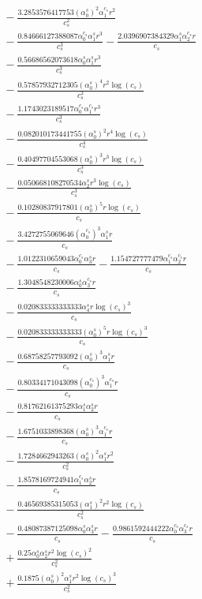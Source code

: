 \documentclass[10pt]{article}
\begin{document}
\begin{align*}
&{}  - \frac{3.2853576417753 \left(\alpha_{0}^s\right)^{2} \alpha_{1}^{c_s} r^{2}}{c_{s}^{2}} \\
&{}  - \frac{0.84666127388087 \alpha_{0}^{c_s} \alpha_{1}^s r^{3}}{c_{s}^{3}} - \frac{2.0396907384329 \alpha_{1}^s \alpha_{2}^{c_s} r}{c_{s}} \\
&{}  - \frac{0.56686562073618 \alpha_{0}^s \alpha_{1}^s r^{3}}{c_{s}^{3}} \\
&{}  - \frac{0.57857932712305 \left(\alpha_{0}^s\right)^{4} r^{2} \log{\left(c_{s} \right)}}{c_{s}^{2}} \\
&{}  - \frac{1.1743023189517 \alpha_{0}^{c_s} \alpha_{1}^{c_s} r^{3}}{c_{s}^{3}} \\
&{}  - \frac{0.082010173441755 \left(\alpha_{0}^s\right)^{2} r^{4} \log{\left(c_{s} \right)}}{c_{s}^{4}} \\
&{}  - \frac{0.40497704553068 \left(\alpha_{0}^s\right)^{3} r^{3} \log{\left(c_{s} \right)}}{c_{s}^{3}} \\
&{}  - \frac{0.050668108270534 \alpha_{2}^s r^{3} \log{\left(c_{s} \right)}}{c_{s}^{3}} \\
&{}  - \frac{0.10280837917801 \left(\alpha_{0}^s\right)^{5} r \log{\left(c_{s} \right)}}{c_{s}} \\
&{}  - \frac{3.4272755069646 \left(\alpha_{0}^{c_s}\right)^{3} \alpha_{1}^s r}{c_{s}} \\
&{}  - \frac{1.0122310659043 \alpha_{0}^{c_s} \alpha_{3}^s r}{c_{s}} - \frac{1.154727777479 \alpha_{1}^{c_s} \alpha_{2}^{c_s} r}{c_{s}} \\
&{}  - \frac{1.3048548230006 \alpha_{0}^s \alpha_{3}^{c_s} r}{c_{s}} \\
&{}  - \frac{0.020833333333333 \alpha_{4}^s r \log{\left(c_{s} \right)}^{3}}{c_{s}} \\
&{}  - \frac{0.020833333333333 \left(\alpha_{0}^s\right)^{5} r \log{\left(c_{s} \right)}^{3}}{c_{s}} \\
&{}  - \frac{0.68758257793092 \left(\alpha_{0}^s\right)^{3} \alpha_{1}^s r}{c_{s}} \\
&{}  - \frac{0.80334171043098 \left(\alpha_{0}^{c_s}\right)^{3} \alpha_{1}^{c_s} r}{c_{s}} \\
&{}  - \frac{0.81762161375293 \alpha_{1}^s \alpha_{2}^s r}{c_{s}} \\
&{}  - \frac{1.6751033898368 \left(\alpha_{0}^s\right)^{3} \alpha_{1}^{c_s} r}{c_{s}} \\
&{}  - \frac{1.7284662943263 \left(\alpha_{0}^s\right)^{2} \alpha_{1}^s r^{2}}{c_{s}^{2}} \\
&{}  - \frac{1.8578169724941 \alpha_{1}^{c_s} \alpha_{2}^s r}{c_{s}} \\
&{}  - \frac{0.46569385315053 \left(\alpha_{1}^s\right)^{2} r^{2} \log{\left(c_{s} \right)}}{c_{s}^{2}} \\
&{}  - \frac{0.48087387125098 \alpha_{0}^s \alpha_{3}^s r}{c_{s}} - \frac{0.9861592444222 \alpha_{0}^{c_s} \alpha_{3}^{c_s} r}{c_{s}} \\
&{}  + \frac{0.25 \alpha_{0}^s \alpha_{2}^s r^{2} \log{\left(c_{s} \right)}^{2}}{c_{s}^{2}} \\
&{}  + \frac{0.1875 \left(\alpha_{0}^s\right)^{2} \alpha_{1}^s r^{2} \log{\left(c_{s} \right)}^{3}}{c_{s}^{2}}
\end{align*}
\end{document}
